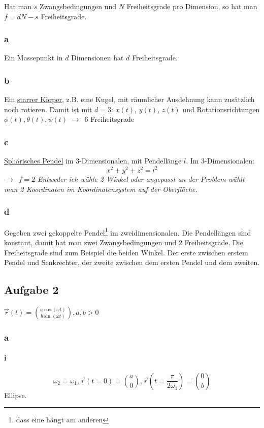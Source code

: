 \documentclass[oneside]{book}
\theoremstyle{definition}
\newcommand{\conseq}{$\rightarrow$~}
\begin{document}
Hat man $s$ Zwangsbedingungen und $N$ Freiheitsgrade pro Dimension, so hat man $f = d N - s$ Freiheitsgrade.

\subsubsection{a}
Ein Massepunkt in $d$ Dimensionen hat $d$ Freiheitsgrade.

\subsubsection{b}
Ein \href{https://de.wikipedia.org/wiki/Starrer_K\%C3\%B6rper}{starrer Körper}, z.B. eine Kugel, mit räumlicher Ausdehnung kann zusätzlich noch rotieren. Damit ist mit $d = 3$: $x(t)$, $y(t)$, $z(t)$ und Rotationsrichtungen $\phi(t), \theta(t), \psi(t)$ \conseq 6 Freiheitsgrade

\subsubsection{c}
\href{http://de.wikipedia.org/wiki/Sph\%C3\%A4risches_Pendel}{Sphärisches Pendel} im 3-Dimensionalen, mit Pendellänge $l$. Im 3-Dimensionalen:
$$x^2 + y^2 + z^2 = l^2$$
\conseq $f = 2$ \textit{Entweder ich wähle 2 Winkel oder angepasst an der Problem wählt man 2 Koordinaten im Koordinatensystem auf der Oberfläche.}

\subsubsection{d}
Gegeben zwei gekoppelte Pendel\footnote{dass eine hängt am anderen} im zweidimensionalen. Die Pendellängen sind konstant, damit hat man zwei Zwangsbedingungen und 2 Freiheitsgrade. Die Freiheitsgrade sind zum Beispiel die beiden Winkel. Der erste zwischen erstem Pendel und Senkrechter, der zweite zwischen dem ersten Pendel und dem zweiten.

\subsection{Aufgabe 2}
$\vec{r}(t) = \binom{a \cos(\omega t)}{b\sin(\omega t)}, a, b > 0$

\subsubsection{a}
\paragraph{i}
$$\omega_2 = \omega_1, \vec{r}(t = 0) = \binom{a}{0}, \vec{r}(t = \frac{\pi}{2 \omega_1}) = \binom{0}{b}$$
Ellipse.
\end{document}
